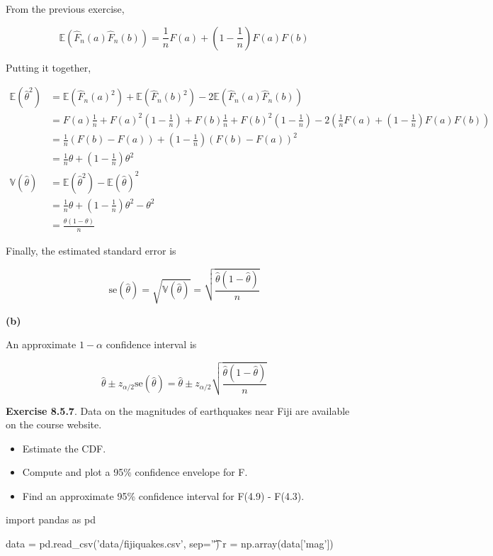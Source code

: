 From the previous exercise,

\[ \mathbb{E}(\hat{F}_n(a)\hat{F}_n(b)) = \frac{1}{n} F(a) + \left( 1 - \frac{1}{n}\right) F(a)F(b) \]

Putting it together,

\begin{align}
\mathbb{E}(\hat{\theta}^2) 
&= \mathbb{E}(\hat{F}_n(a)^2) + \mathbb{E}(\hat{F}_n(b)^2) - 2 \mathbb{E}(\hat{F}_n(a)\hat{F}_n(b)) \\
&=   F(a) \frac{1}{n} + F(a)^2 \left(1 - \frac{1}{n} \right) +  F(b) \frac{1}{n} + F(b)^2 \left(1 - \frac{1}{n} \right) - 2 \left( \frac{1}{n} F(a) + \left( 1 - \frac{1}{n}\right) F(a)F(b) \right) \\
&=  \frac{1}{n} \left(F(b) - F(a)\right) + \left( 1 - \frac{1}{n}\right) \left( F(b) - F(a) \right)^2 \\
&=  \frac{1}{n} \theta + \left( 1 - \frac{1}{n} \right) \theta^2 \\
\mathbb{V}(\hat{\theta}) &=  \mathbb{E}(\hat{\theta}^2) - \mathbb{E}(\hat{\theta})^2 \\
&=  \frac{1}{n} \theta + \left( 1 - \frac{1}{n} \right) \theta^2 - \theta^2 \\
&= \frac{\theta (1 - \theta)}{n} 
\end{align}

Finally, the estimated standard error is

\[\text{se}(\hat{\theta}) = \sqrt{\mathbb{V}(\hat{\theta})} = \sqrt{\frac{\hat{\theta}(1 - \hat{\theta})}{n}}\]

\textbf{(b)}

An approximate \(1 - \alpha\) confidence interval is

\[ \hat{\theta} \pm z_{\alpha/2}\text{se}(\hat{\theta}) = \hat{\theta} \pm z_{\alpha/2} \sqrt{\frac{\hat{\theta}(1 - \hat{\theta})}{n}}\]

\textbf{Exercise 8.5.7}. Data on the magnitudes of earthquakes near Fiji
are available on the course website.

\begin{itemize}[tightlist]
\item
  Estimate the CDF.
\item
  Compute and plot a 95\% confidence envelope for F.
\item
  Find an approximate 95\% confidence interval for F(4.9) - F(4.3).
\end{itemize}

\begin{python}
import pandas as pd

data = pd.read_csv('data/fijiquakes.csv', sep='\t')
r = np.array(data['mag'])
\end{python}

